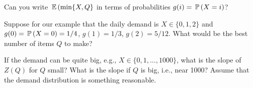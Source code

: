 \begin{exercise}
  Can you write $\E(\min\{X,Q\}$ in terms of probabilities $g(i) = \P(X=i)$?

\end{exercise}

\begin{exercise}
  Suppose for our example that the daily demand is $X\in \{0,1,2\}$
  and $g(0) = \P(X=0)=1/4$, $g(1)=1/3$, $g(2)=5/12$. What would be the
  best number of items $Q$ to make?

\end{exercise}


\begin{exercise}
If the demand can be quite big, e.g., $X\in\{0,1,\ldots, 1000\}$, what is the slope of $Z(Q)$ for $Q$ small? What is the slope if $Q$ is big, i.e., near 1000? Assume that the demand distribution is something reasonable.

\end{exercise}

